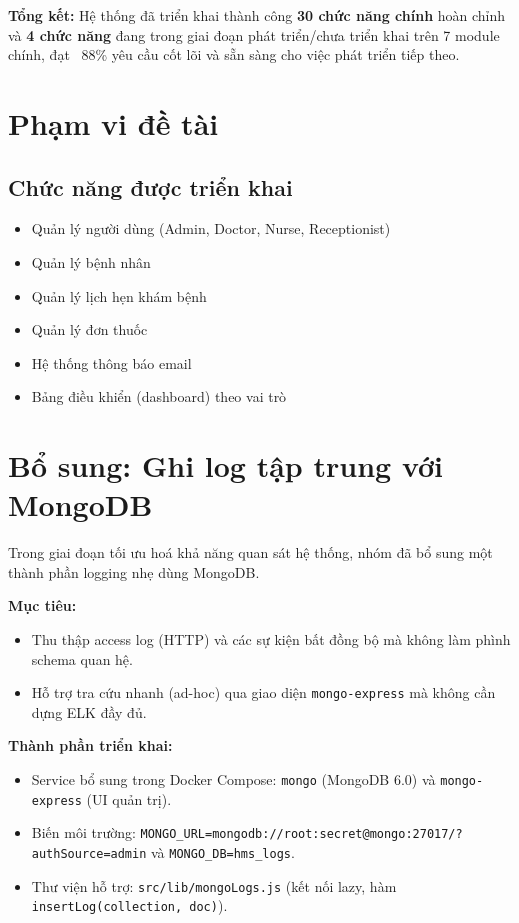 \documentclass[12pt,a4paper]{report}
\begin{document}
    \textbf{Tổng kết:} Hệ thống đã triển khai thành công \textbf{30 chức năng chính} hoàn chỉnh và \textbf{4 chức năng} đang trong giai đoạn phát triển/chưa triển khai trên 7 module chính, đạt ~88\% yêu cầu cốt lõi và sẵn sàng cho việc phát triển tiếp theo.

    \section{Phạm vi đề tài}
    \subsection{Chức năng được triển khai}
    \begin{itemize}
        \item Quản lý người dùng (Admin, Doctor, Nurse, Receptionist)
        \item Quản lý bệnh nhân
        \item Quản lý lịch hẹn khám bệnh
        \item Quản lý đơn thuốc
        \item Hệ thống thông báo email
        \item Bảng điều khiển (dashboard) theo vai trò
    \end{itemize}

    \section{Bổ sung: Ghi log tập trung với MongoDB}\label{sec:logging-mongo}
    Trong giai đoạn tối ưu hoá khả năng quan sát hệ thống, nhóm đã bổ sung một thành phần logging nhẹ dùng MongoDB.

            \textbf{Mục tiêu:}
    \begin{itemize}
        \item Thu thập access log (HTTP) và các sự kiện bất đồng bộ mà không làm phình schema quan hệ.
        \item Hỗ trợ tra cứu nhanh (ad-hoc) qua giao diện \texttt{mongo-express} mà không cần dựng ELK đầy đủ.
    \end{itemize}

            \textbf{Thành phần triển khai:}
    \begin{itemize}
        \item Service bổ sung trong Docker Compose: \texttt{mongo} (MongoDB 6.0) và \texttt{mongo-express} (UI quản trị).
        \item Biến môi trường: \texttt{MONGO\_URL=mongodb://root:secret@mongo:27017/?authSource=admin} và \texttt{MONGO\_DB=hms\_logs}.
        \item Thư viện hỗ trợ: \texttt{src/lib/mongoLogs.js} (kết nối lazy, hàm \texttt{insertLog(collection, doc)}).
    \end{itemize}
\end{document}
